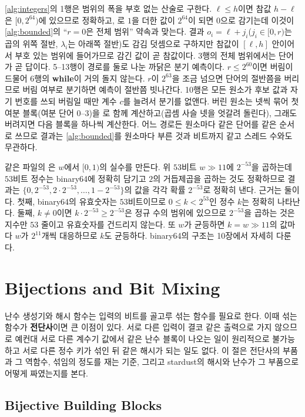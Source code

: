 \cref{alg:integers}의 1행은 범위의 폭을 부호 없는 산술로 구한다. $\ell\le h$이면 참값 $h-\ell$은 $[0,2^{64})$에 있으므로 정확하고, 로 $1$을 더한 값이 $2^{64}$이 되면 $0$으로 감기는데 이것이 \cref{alg:bounded}의 ``$r=0$은 전체 범위'' 약속과 맞는다. 결과 $o_i=\ell+j_i$($j_i\in[0,r)$는 곱의 위쪽 절반, $\lambda_i$는 아래쪽 절반)도 감김 덧셈으로 구하지만 참값이 $[\ell,h]$ 안이어서 부호 있는 범위에 들어가므로 감긴 값이 곧 참값이다. 3행의 전체 범위에서는 단어가 곧 답이다. 5--13행이 경로를 둘로 나눈 까닭은 분기 예측이다. $r\le2^{60}$이면 버림이 드물어 6행의 \textbf{while}이 거의 돌지 않는다. $r$이 $2^{63}$을 조금 넘으면 단어의 절반쯤을 버리므로 버림 여부로 분기하면 예측이 절반쯤 빗나간다. 10행은 모든 원소가 후보 값과 자기 번호를 쓰되 버림일 때만 계수 $c$를 늘려서 분기를 없앤다. 버린 원소는 넷씩 묶어 첫 여분 블록(여분 단어 $0$--$3$)을 로 함께 계산하고(곱셈 사슬 넷을 엇갈려 돌린다), 그래도 버려지면 다음 블록을 하나씩 계산한다. 어느 경로든 원소마다 같은 단어를 같은 순서로 쓰므로 결과는 \cref{alg:bounded}를 원소마다 부른 것과 비트까지 같고 스레드 수와도 무관하다.

같은 파일의 은 $w$에서 $[0,1)$의 실수를 만든다. 위 $53$비트 $w\gg11$에 $2^{-53}$을 곱하는데 $53$비트 정수는 binary64에 정확히 담기고 $2$의 거듭제곱을 곱하는 것도 정확하므로 결과는 $\{0,2^{-53},2\cdot2^{-53},\dots,1-2^{-53}\}$의 값을 각각 확률 $2^{-53}$로 정확히 낸다. 근거는 둘이다. 첫째, binary64의 유효숫자는 $53$비트이므로 $0\le k<2^{53}$인 정수 $k$는 정확히 나타난다. 둘째, $k\ne0$이면 $k\cdot2^{-53}\ge2^{-53}$은 정규 수의 범위에 있으므로 $2^{-53}$을 곱하는 것은 지수만 $53$ 줄이고 유효숫자를 건드리지 않는다. 또 $w$가 균등하면 $k=w\gg11$의 값마다 $w$가 $2^{11}$개씩 대응하므로 $k$도 균등하다. binary64의 구조는 10장에서 자세히 다룬다.


\section{Bijections and Bit Mixing}
\label{sec:bijection}

난수 생성기와 해시 함수는 입력의 비트를 골고루 섞는 함수를 필요로 한다. 이때 섞는 함수가 \textbf{전단사}이면 큰 이점이 있다. 서로 다른 입력이 결코 같은 출력으로 가지 않으므로 예컨대 서로 다른 계수기 값에서 같은 난수 블록이 나오는 일이 원리적으로 불가능하고 서로 다른 정수 키가 섞인 뒤 같은 해시가 되는 일도 없다. 이 절은 전단사의 부품과 그 역함수, 섞임의 정도를 재는 기준, 그리고 stardust의 해시와 난수가 그 부품으로 어떻게 짜였는지를 본다.

\subsection{Bijective Building Blocks}

